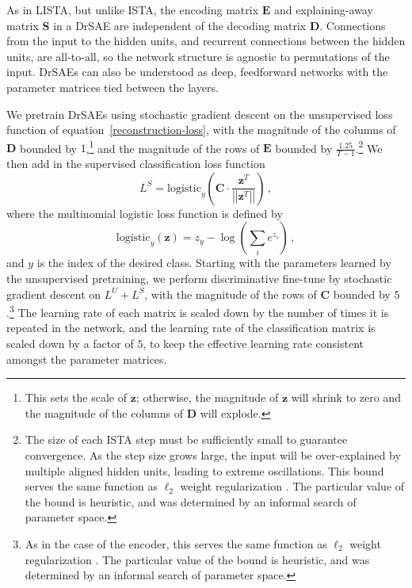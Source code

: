 \documentclass{article} %
\newcommand{\hid}{\mathbf{z}}
\newcommand{\nobfhid}{z}
\newcommand{\out}{y}
\newcommand{\C}{\mathbf{C}}
\newcommand{\D}{\mathbf{D}}
\newcommand{\E}{\mathbf{E}}
\newcommand{\Sm}{\mathbf{S}}
\newcommand{\logistic}{\text{logistic}}
\begin{document}
As in LISTA, but unlike ISTA, the encoding matrix $\E$ and explaining-away matrix $\Sm$ in a DrSAE are independent of the decoding matrix $\D$.
Connections from the input to the hidden units, and recurrent connections between the hidden units, are all-to-all, so the network structure is agnostic to permutations of the input.    
DrSAEs can also be understood as deep, feedforward networks with the parameter matrices tied between the layers.


We pretrain DrSAEs using stochastic gradient descent on the unsupervised loss function of equation~\ref{reconstruction-loss}, with the magnitude of the columns of $\D$ bounded by $1$,\footnote{This sets the scale of $\hid$; otherwise, the magnitude of $\hid$ will shrink to zero and the magnitude of the columns of $\D$ will explode.} and the magnitude of the rows of $\E$ bounded by $\frac{1.25}{T-1}$.\footnote{The size of each ISTA step must be sufficiently small to guarantee convergence.  As the step size grows large, the input will be over-explained by multiple aligned hidden units, leading to extreme oscillations.  This bound serves the same function as $\ell_2$ weight regularization \citep{hinton2010}.  The particular value of the bound is heuristic, and was determined by an informal search of parameter space.}  We then add in the supervised classification loss function
\begin{equation} \label{discriminative-loss}
L^S = \logistic_\out \left( \C \cdot \frac{\hid^T}{\left|\left| \hid^T \right|\right|} \right) \, ,
\end{equation}
where the multinomial logistic loss function is defined by 
\begin{equation*}
  \logistic_\out(\hid) = \nobfhid_\out - \log\left( \sum_i e^{\nobfhid_i} \right) \, ,
\end{equation*}
and $\out$ is the index of the desired class.
Starting with the parameters learned by the unsupervised pretraining, we perform discriminative fine-tune by stochastic gradient descent on $L^U + L^S$, with the magnitude of the rows of $\C$ bounded by $5$.\footnote{As in the case of the encoder, this serves the same function as $\ell_2$ weight regularization \citep{hinton2010}.  The particular value of the bound is heuristic, and was determined by an informal search of parameter space.}  The learning rate of each matrix is scaled down by the number of times it is repeated in the network, and the learning rate of the classification matrix is scaled down by a factor of $5$, to keep the effective learning rate consistent amongst the parameter matrices.
\end{document}
